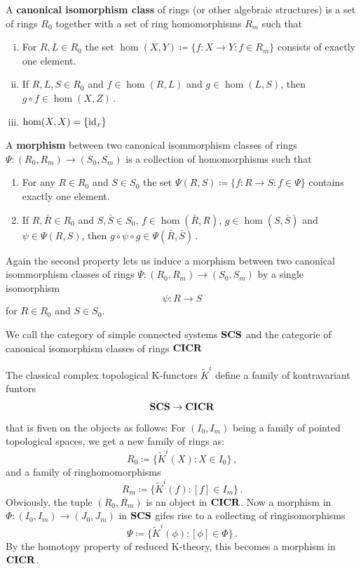 \begin{definition}
	A \textbf{canonical isomorphism class } of rings (or other algebraic structures) is a set of rings $R_0$ together with a set of ring homomorphisms $R_m$ such that
	\begin{enumerate}[(i)]
		\item For $R,L \in R_0$ the set $\hom(X,Y)\coloneq \{f:X\to Y: f \in R_m\}$ consists of exactly one element. 
		\item If $R,L,S\in R_0$ and $f\in \hom(R,L)$ and $g\in \hom(L,S)$, then $g\circ f\in \hom(X,Z)\,$.
		\item $\hom(X,X)=\{\operatorname{\mathrm{id}}_x\}$
	\end{enumerate}
	A \textbf{morphism} between two canonical isommorphism classes of rings $\Psi: (R_0,R_m)\to (S_0,S_m)$ is a collection of homomorphisms such that 
	\begin{enumerate}
		\item For any $R\in R_0$ and $S\in S_0$ the set $\Psi(R,S)\coloneq \{f:R\to S: f\in \Psi\}$ contains exactly one element.
		\item If $R,\bar{R}\in R_0$ and $S,\bar{S}\in S_0$, $f\in \hom(\bar{R},R)$, $g\in \hom(S,\bar{S})$ and $\psi\in \Psi(R,S)$, then $g\circ \psi\circ g\in \Psi(\bar{R},\bar{S})\,$.
	\end{enumerate}
\end{definition}
\begin{remark}
	Again the second property lets us induce a morphism between two canonical isommorphism classes of rings $\Psi: (R_0,R_m)\to (S_0,S_m)$ by a single isomorphism 
	\begin{equation*}
		\psi: R\to S
	\end{equation*} for $R\in R_0$ and $S\in S_0$.
\end{remark}
\begin{remark}
	We call the category of simple connected systems $\operatorname{\mathbf{SCS}}$ and the categorie of canonical isomorphism classes of rings $\operatorname{\mathbf{CICR}}$ 
\end{remark}
\begin{definition}
	The classical complex topological K-functors $\tilde{K}^i$ define a family of kontravariant funtors 
	\begin{align*}
		\operatorname{\mathbf{SCS}} \to \operatorname{\mathbf{CICR}}
	\end{align*} that is fiven on the objects as follows:
	For $(I_0,I_m)$ being a family of pointed topological spaces, we get a new family of rings as:
	\begin{equation*}
		R_0\coloneq \{\tilde{K}^i(X): X\in I_0\}\,,
	\end{equation*} and a family of ringhomomorphisms 
	\begin{equation*}
		R_m \coloneq \{\tilde{K}^i(f):[f]\in I_m\}\,.
	\end{equation*}Obviously, the tuple $(R_0,R_m)$ is an object in $\operatorname{\mathbf{CICR}}$. 
	Now a morphism in $\Phi:(I_0,I_m)\to (J_0,J_m)$ in $\operatorname{\mathbf{SCS}}$ gifes rise to a collecting of ringisomorphisms
	\begin{equation*}
		\Psi\coloneq \{\tilde{K}^i(\phi):[\phi]\in \Phi\}\,.
	\end{equation*}By the homotopy property of reduced K-theory, this becomes a morphism in $\operatorname{\mathbf{CICR}}$.
\end{definition}
